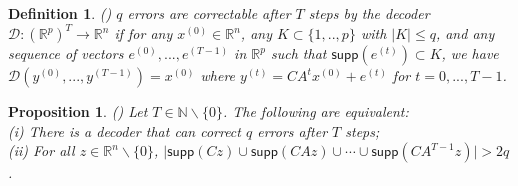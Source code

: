 \documentclass[journal]{IEEEtran}
\newtheorem{Def}{\bf{Definition}}
\newtheorem{prop}{\bf{Proposition}}
\begin{document}
\begin{Def} \emph{(\hspace{1sp}\cite{Fawzi2014})} $q$ errors are correctable after $T$ steps by the decoder $\mathcal{D}: {(\mathbb{R} ^p) } ^T  \rightarrow \mathbb{R}^n$ if for any $x^{(0)} \in \mathbb{R}^n$, any $K \subset \{1,.., p\} $ with $\lvert K \rvert \le q$, and any sequence of vectors $e^{(0)},...,e^{(T-1)}$ in $\mathbb{R}^p$ such that $\textsf{supp}(e^{(t)}) \subset K$, we have $\mathcal{D} (y^{(0)},...,y^{(T-1)}) = x^{(0)}$ where $y^{(t)} = CA^t x^{(0)} + e^{(t)}$ for $t=0,...,T-1$.
\end{Def}

\begin{prop}  \emph{(\hspace{1sp}\cite{Fawzi2014})}  \label{prop:Fawzi} Let $T \in \mathbb{N}  \backslash \{ 0\}$. The following are equivalent:\\
(i) There is a decoder that can correct $q$ errors after $T$ steps;\\
(ii) For all $z\in \mathbb{R}^n \backslash \{0\}$, $\lvert \textsf{supp}(Cz) \cup \textsf{supp}(CAz) \cup \cdots \cup \textsf{supp}(CA^{T-1} z) \rvert > 2q$.
\end{prop}
\end{document}
